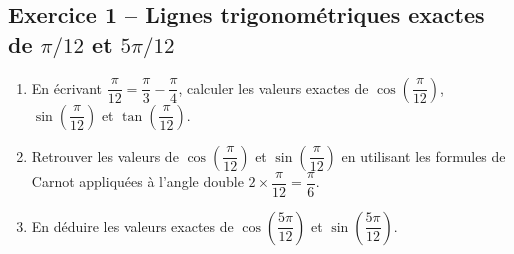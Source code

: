 \documentclass[11pt,a4paper]{article}
\begin{document}
\subsection*{Exercice 1 -- Lignes trigonométriques exactes de $\pi/12$ et $5\pi/12$}

\begin{enumerate}[label=\arabic*.]
    \item En écrivant $\dfrac{\pi}{12} = \dfrac{\pi}{3} - \dfrac{\pi}{4}$, calculer les valeurs exactes de $\cos\left(\dfrac{\pi}{12}\right)$, $\sin\left(\dfrac{\pi}{12}\right)$ et $\tan\left(\dfrac{\pi}{12}\right)$.
    \item Retrouver les valeurs de $\cos\left(\dfrac{\pi}{12}\right)$ et $\sin\left(\dfrac{\pi}{12}\right)$ en utilisant les formules de Carnot appliquées à l'angle double $2 \times \dfrac{\pi}{12} = \dfrac{\pi}{6}$.
    \item En déduire les valeurs exactes de $\cos\left(\dfrac{5\pi}{12}\right)$ et $\sin\left(\dfrac{5\pi}{12}\right)$.
\end{enumerate}
\end{document}
